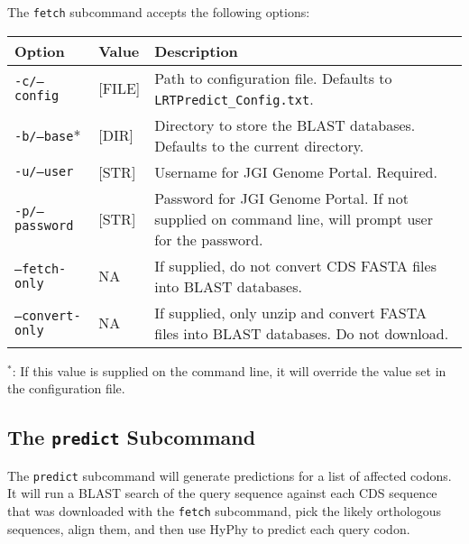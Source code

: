 \documentclass[12pt]{article}
\begin{document}
\par The \texttt{fetch} subcommand accepts the following options:
\begin{table}[H]
    \centering
    \begin{tabular}{p{105pt} l p{260pt}}
    \toprule
    Option & Value & Description \\
    \midrule
    \texttt{-c/--config} & [FILE] & Path to configuration file. Defaults to \texttt{LRTPredict\_Config.txt}. \\
    \midrule
    \texttt{-b/--base}* & [DIR] & Directory to store the BLAST databases. Defaults to the current directory.\\
    \midrule
    \texttt{-u/--user} & [STR] & Username for JGI Genome Portal. Required.\\
    \midrule
    \texttt{-p/--password} & [STR] & Password for JGI Genome Portal. If not supplied on command line, will prompt user for the password.\\
    \midrule
    \texttt{--fetch-only} & NA & If supplied, do not convert CDS FASTA files into BLAST databases.\\
    \midrule
    \texttt{--convert-only} & NA & If supplied, only unzip and convert FASTA files into BLAST databases. Do not download.\\
    \bottomrule
    \end{tabular}
\end{table}
\par $^*$: If this value is supplied on the command line, it will override
the value set in the configuration file.

\subsection*{The \texttt{predict} Subcommand}
\par The \texttt{predict} subcommand will generate predictions for a list of
affected codons. It will run a BLAST search of the query sequence against each CDS sequence
that was downloaded with the \texttt{fetch} subcommand, pick the likely
orthologous sequences, align them, and then use HyPhy to predict each query
codon.
\end{document}
